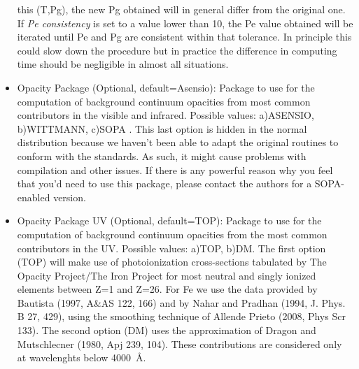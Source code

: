 \begin{itemize}
  this (T,Pg), the new Pg obtained will in general differ from the
  original one. If {\em Pe consistency} is set to a value lower than
  10, the Pe value obtained will be iterated until Pe and Pg are
  consistent within that tolerance. In principle this could slow down
  the procedure but in practice the difference in computing time
  should be negligible in almost all situations.
\item Opacity Package (Optional, default=Asensio): Package to use for
  the computation of background continuum opacities from most common
  contributors in the visible and infrared. Possible values:
  a)ASENSIO, b)WITTMANN, c)SOPA . This last option is hidden in the
  normal distribution because we haven't been able to adapt the
  original routines to conform with the standards. As such, it might
  cause problems with compilation and other issues. If there is any
  powerful reason why you feel that you'd need to use this package,
  please contact the authors for a SOPA-enabled version.
\item Opacity Package UV (Optional, default=TOP): Package to use for
  the computation of background continuum opacities from the most common
  contributors in the UV. Possible values: a)TOP, b)DM. The first
  option (TOP) will make use of photoionization cross-sections
  tabulated by The Opacity Project/The Iron Project for most neutral
  and singly ionized elements between Z=1 and Z=26. For Fe we use the
  data provided by Bautista (1997, A\&AS 122, 166) and by Nahar and
  Pradhan (1994, J. Phys. B 27, 429), using the smoothing technique of
  Allende Prieto (2008, Phys Scr 133). The second option (DM) uses the
  approximation of Dragon and Mutschlecner (1980, Apj 239, 104). These
  contributions are considered only at wavelenghts below 4000~\AA .

\end{itemize}
